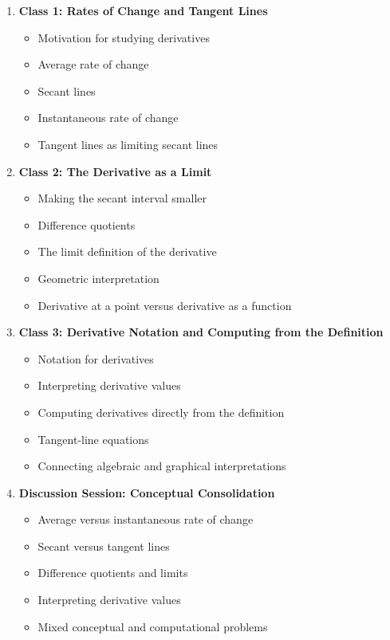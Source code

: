 \documentclass{article}
\begin{document}
\begin{enumerate}
    \item \textbf{Class 1: Rates of Change and Tangent Lines}
    \begin{itemize}
        \item Motivation for studying derivatives
        \item Average rate of change
        \item Secant lines
        \item Instantaneous rate of change
        \item Tangent lines as limiting secant lines
    \end{itemize}

    \item \textbf{Class 2: The Derivative as a Limit}
    \begin{itemize}
        \item Making the secant interval smaller
        \item Difference quotients
        \item The limit definition of the derivative
        \item Geometric interpretation
        \item Derivative at a point versus derivative as a function
    \end{itemize}

    \item \textbf{Class 3: Derivative Notation and Computing from the Definition}
    \begin{itemize}
        \item Notation for derivatives
        \item Interpreting derivative values
        \item Computing derivatives directly from the definition
        \item Tangent-line equations
        \item Connecting algebraic and graphical interpretations
    \end{itemize}

    \item \textbf{Discussion Session: Conceptual Consolidation}
    \begin{itemize}
        \item Average versus instantaneous rate of change
        \item Secant versus tangent lines
        \item Difference quotients and limits
        \item Interpreting derivative values
        \item Mixed conceptual and computational problems
    \end{itemize}
\end{enumerate}
\end{document}
